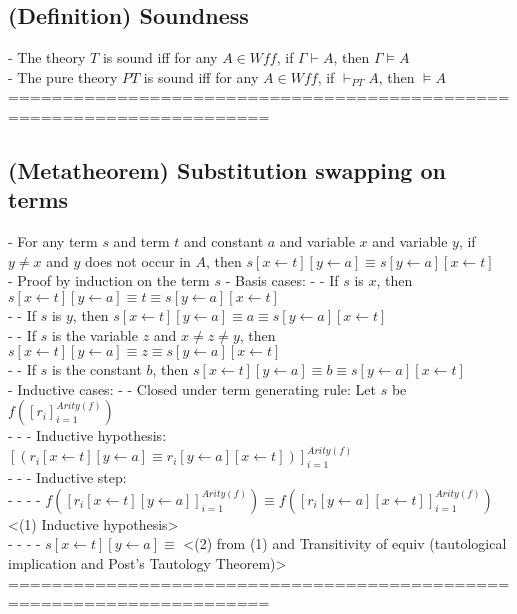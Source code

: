 \documentclass{article}
\begin{document}
\subsection{(Definition) Soundness}
	- The theory $T$ is sound iff for any $A \in Wff$, if $\Gamma \vdash A$, then $\Gamma \vDash A$ \\
	- The pure theory $PT$ is sound iff for any $A \in Wff$, if $\vdash_{PT} A$, then $\vDash A$ \\
	======================================================================
\subsection{(Metatheorem) Substitution swapping on terms}
	- For any term $s$ and term $t$ and constant $a$ and variable $x$ and variable $y$, if $y \neq x$ and $y$ does not occur in $A$, then $s[x \leftarrow t][y \leftarrow a] \equiv s[y \leftarrow a][x \leftarrow t]$ \\
	- Proof by induction on the term $s$
	- Basis cases:
		- - If $s$ is $x$, then $s[x \leftarrow t][y \leftarrow a] \equiv t \equiv s[y \leftarrow a][x \leftarrow t]$ \\
		- - If $s$ is $y$, then $s[x \leftarrow t][y \leftarrow a] \equiv a \equiv s[y \leftarrow a][x \leftarrow t]$ \\
		- - If $s$ is the variable $z$ and $x \neq z \neq y$, then $s[x \leftarrow t][y \leftarrow a] \equiv z \equiv s[y \leftarrow a][x \leftarrow t]$ \\
		- - If $s$ is the constant $b$, then $s[x \leftarrow t][y \leftarrow a] \equiv b \equiv s[y \leftarrow a][x \leftarrow t]$ \\
	- Inductive cases:
		- - Closed under term generating rule: Let $s$ be $f([r_i]_{i=1}^{Arity(f)})$ \\
			- - - Inductive hypothesis: $[(r_i[x \leftarrow t][y \leftarrow a] \equiv r_i[y \leftarrow a][x \leftarrow t])]_{i=1}^{Arity(f)}$ \\
			- - - Inductive step: \\
				- - - - $f([r_i[x \leftarrow t][y \leftarrow a]]_{i=1}^{Arity(f)}) \equiv f([r_i[y \leftarrow a][x \leftarrow t]]_{i=1}^{Arity(f)})$ <(1) Inductive hypothesis> \\
				- - - - $s[x \leftarrow t][y \leftarrow a] \equiv $ <(2) from (1) and Transitivity of equiv (tautological implication and Post's Tautology Theorem)> \\
	======================================================================
\end{document}
